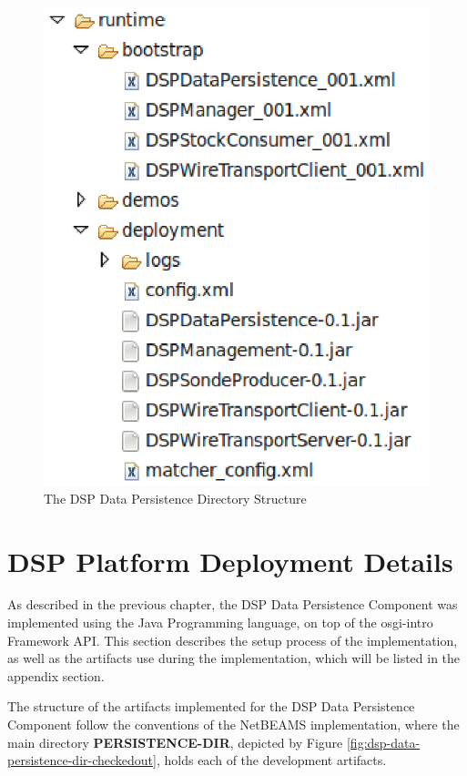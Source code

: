 \begin{figure}[!t]
  \centering
  \includegraphics[scale=0.5]{../diagrams/dsp-runtime-dir}
  \caption{The DSP Data Persistence Directory Structure}
  \label{fig:dsp-runtime-dir}
\end{figure}

\section{DSP Platform Deployment Details}

As described in the previous chapter, the DSP Data Persistence Component was
implemented using the Java Programming language, on top of the osgi-intro Framework
API. This section describes the setup process of the implementation, as well as
the artifacts use during the implementation, which will be listed in the
appendix section.

The structure of the artifacts implemented for the DSP Data Persistence
Component follow the conventions of the NetBEAMS implementation, where the main
directory \textbf{PERSISTENCE-DIR}, depicted by Figure
\ref{fig:dsp-data-persistence-dir-checkedout}, holds each of the development
artifacts.

